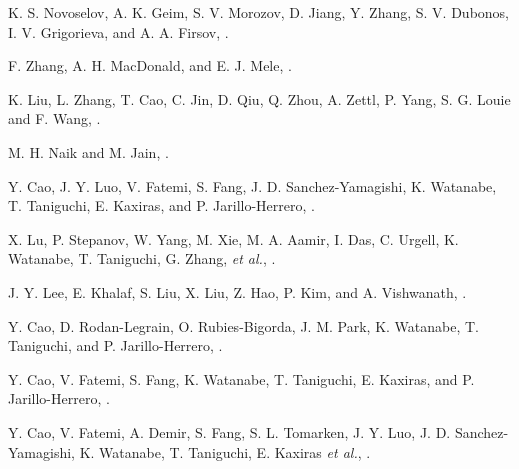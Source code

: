 \documentclass[%
reprint,
amsmath,amssymb,amsfonts
aps,
superscriptaddress,
prx
]{revtex4-1}
\begin{document}
\begin{thebibliography}{99}

 K. S. Novoselov, A. K. Geim, S. V. Morozov, D. Jiang, Y. Zhang, S. V. Dubonos, I. V. Grigorieva, and A. A. Firsov, 
\href{https://doi.org/10.1126/science.1102896}{}.

 F. Zhang, A. H. MacDonald, and E. J. Mele, 
\href{https://doi.org/10.1073/pnas.1308853110}{}.

 K. Liu, L. Zhang, T. Cao, C. Jin, D. Qiu, Q. Zhou, A. Zettl, P. Yang, S. G. Louie and F. Wang, 
\href{https://doi.org/10.1038/ncomms5966}{}.

 M. H. Naik and M. Jain, 
\href{https://doi.org/10.1103/PhysRevLett.121.266401}{}.

 Y. Cao, J. Y. Luo, V. Fatemi, S. Fang, J. D. Sanchez-Yamagishi, K. Watanabe, T. Taniguchi, E. Kaxiras, and P. Jarillo-Herrero, 
\href{https://doi.org/10.1103/PhysRevLett.117.116804}{}.

 X. Lu, P. Stepanov, W. Yang, M. Xie, M. A. Aamir, I. Das, C. Urgell, K. Watanabe, T. Taniguchi, G. Zhang, \textit{et al.}, 
\href{https://doi.org/10.1038/s41586-019-1695-0}{}.

 J. Y. Lee, E. Khalaf, S. Liu, X. Liu, Z. Hao, P. Kim, and A. Vishwanath, 
\href{https://doi.org/10.1038/s41467-019-12981-1}{}.

 Y. Cao, D. Rodan-Legrain, O. Rubies-Bigorda, J. M. Park, K. Watanabe, T. Taniguchi, and P. Jarillo-Herrero, 
\href{https://doi.org/10.1038/s41586-020-2260-6}{}.

 Y. Cao, V. Fatemi, S. Fang, K. Watanabe, T. Taniguchi, E. Kaxiras, and P. Jarillo-Herrero, 
\href{https://doi.org/10.1038/nature26160}{}.

 Y. Cao, V. Fatemi, A. Demir, S. Fang, S. L. Tomarken, J. Y. Luo, J. D. Sanchez-Yamagishi, K. Watanabe, T. Taniguchi, E. Kaxiras \textit{et al.}, 
\href{https://doi.org/10.1038/nature26154}{}.


\end{thebibliography}
\end{document}
